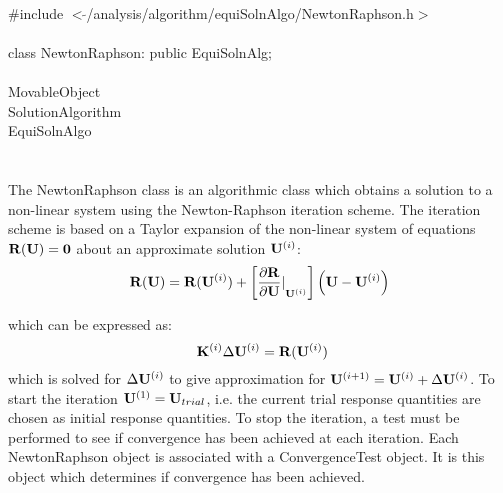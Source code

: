 
   \\
\indent \#include $<\tilde{
}$/analysis/algorithm/equiSolnAlgo/NewtonRaphson.h$>$  \\ 

  \\
\indent class NewtonRaphson: public EquiSolnAlg;  \\

 \\
\indent MovableObject \\
\indent\indent SolutionAlgorithm \\
\indent\indent\indent EquiSolnAlgo \\
\indent\indent\indent{} \\

 \\ 
\indent The NewtonRaphson class is an algorithmic class which obtains a
solution to a non-linear system using the Newton-Raphson iteration
scheme. The iteration scheme is based on a Taylor expansion of the
non-linear system of equations ${\bf R}({\bf U}) = {\bf 0}$ about an approximate
solution ${\bf U}^{(i)}$:
\begin{equation} 
{\bf R}({\bf U}) = 
{\bf R}({\bf U}^{(i)}) +
\left[ {\frac{\partial {\bf R}}{\partial {\bf U}} \vert}_{{\bf U}^{(i)}}\right]
\left( {\bf U} - {\bf U}^{(i)} \right) 
\end{equation}

\noindent which can be expressed as:
\begin{equation} \
{\bf K}^{(i)}  \Delta {\bf U}^{(i)} = {\bf R}({\bf U}^{(i)})
\end{equation}
which is solved for $\Delta {\bf U}^{(i)}$ to give approximation for
${\bf U}^{(i+1)} = {\bf U}^{(i)} + \Delta {\bf U}^{(i)}$. To start the
iteration ${\bf U}^{(1)} = {\bf U}_{trial}$, i.e. the current trial
response quantities are chosen as initial response quantities. 
To stop the iteration, a test must be performed to see if convergence
has been achieved at each iteration. Each NewtonRaphson object is
associated with a ConvergenceTest object. It is this object which
determines if convergence has been achieved. \\

